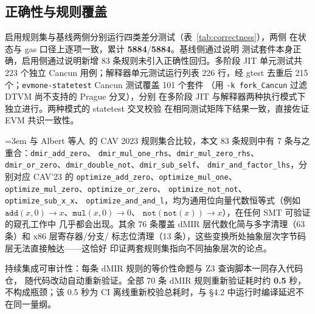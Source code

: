 \subsection{正确性与规则覆盖}
\label{sec:correctness}



启用规则集与基线两侧分别运行四类差分测试（表~\ref{tab:correctness}），两侧
在状态与 gas 口径上逐项一致，累计 \textbf{5884}/\textbf{5884}。基线侧通过说明
测试套件本身正确，启用侧通过说明新增 83 条规则未引入正确性回归。多阶段
JIT 单元测试共 223 个独立 Cancun 用例；解释器单元测试运行列表 226 行，经
gtest 去重后 215 个；\texttt{evmone-statetest} Cancun 测试覆盖 101 个套件
（用 \texttt{-k fork\_Cancun} 过滤 DTVM 尚不支持的 Prague 分叉），分别
在多阶段 JIT 与解释器两种执行模式下独立进行。两种模式的 statetest 交叉校验
在相同测试矩阵下结果一致，直接佐证 EVM 共识一致性。

\begingroup\sloppy\emergencystretch=3em
与 Albert 等人~\cite{verified_evm_cav23}的 CAV 2023 规则集合比较，本文 83
条规则中有 7 条与之重合：\texttt{dmir\_add\_zero}、
\texttt{dmir\_mul\_one\_rhs}、\texttt{dmir\_mul\_zero\_rhs}、
\texttt{dmir\_or\_zero}、\texttt{dmir\_double\_not}、\texttt{dmir\_sub\_self}、
\texttt{dmir\_and\_factor\_lhs}，分别对应 CAV'23 的
\texttt{optimize\_add\_zero}、\texttt{optimize\_mul\_one}、
\texttt{optimize\_mul\_zero}、\texttt{optimize\_or\_zero}、
\texttt{optimize\_not\_not}、\texttt{optimize\_sub\_x\_x}、
\texttt{optimize\_and\_and\_l}，均为通用位向量代数恒等式（例如
$\texttt{add}(x,0) \to x$、$\texttt{mul}(x,0) \to 0$、
$\texttt{not}(\texttt{not}(x)) \to x$），在任何 SMT 可验证的窥孔工作中
几乎都会出现。其余 76 条覆盖 dMIR 层代数化简与多字清理（63 条）和 x86 层寄存器/分支/
标志位清理（13 条），这些变换所处抽象层次字节码层无法直接触达——这恰好
印证两套规则集指向不同抽象层次的论点。
\par\endgroup

持续集成可审计性：每条 dMIR 规则的等价性命题与 Z3 查询脚本一同存入代码仓，
随代码改动自动重新验证。全部 70 条 dMIR 规则重新验证耗时约 \textbf{0.5} 秒，
不构成瓶颈；该 0.5 秒为 CI 离线重新校验总耗时，与 §4.2 中运行时编译延迟不
在同一量纲。
